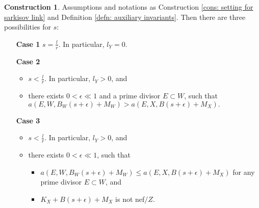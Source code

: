 \documentclass[11pt]{amsart}
\numberwithin{equation}{section}
\theoremstyle{definition}
\newtheorem{cons}[thm]{Construction}
\theoremstyle{remark}
\theoremstyle{definition}
\begin{document}
\begin{cons}\label{cons: cases of sarkisov link with scaling}
Assumptions and notations as Construction \ref{cons: setting for sarkisov link} and Definition \ref{defn: auxiliary invariants}. Then there are three possibilities for $s$:
\begin{itemize}
   \item[\textbf{Case 1}] $s=\frac{l}{r}$. In particular, $l_Y=0.$
    \item[\textbf{Case 2}] 
    \begin{itemize}
        \item $s<\frac{l}{r}$. In particular, $l_Y>0$, and 
        \item there exists $0<\epsilon\ll 1$ and a prime divisor $E\subset W$, such that $a(E,W,B_W(s+\epsilon)+M_W)>a(E,X,B(s+\epsilon)+M_X).$
    \end{itemize}
        \item[\textbf{Case 3}] 
    \begin{itemize}
        \item $s<\frac{l}{r}$. In particular, $l_Y>0$, and 
        \item there exists $0<\epsilon\ll 1$, such that 
        \begin{itemize}
            \item $a(E,W,B_W(s+\epsilon)+M_W)\leq a(E,X,B(s+\epsilon)+M_X)$ for any prime divisor $E\subset W$, and
            \item $K_X+B(s+\epsilon)+M_X$ is not nef$/Z$.
        \end{itemize} 
    \end{itemize}
\end{itemize}
\end{cons}
\end{document}
